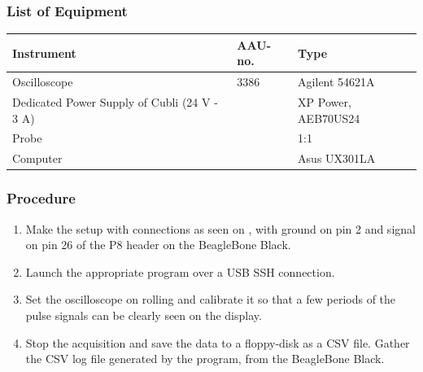 \subsubsection{List of Equipment}
\begin{table}[H]
  \begin{tabular}{|l|l|p{4.3cm}|}
    \hline%
    \textbf{Instrument}                                   &  \textbf{AAU-no.} &  \textbf{Type}            \\
    \hline%
    Oscilloscope                                          &  3386             &  Agilent 54621A           \\
    \hline%
    Dedicated Power Supply of Cubli \small{(24 V - 3 A)}  &                   &  XP Power, AEB70US24      \\
    \hline%
    Probe                                                 &                   &  1:1                      \\
    \hline%
      Computer                                            &                   &  Asus UX301LA  \\
    \hline%
  \end{tabular}
\end{table}

\subsubsection{Procedure}
\begin{enumerate}
  \item Make the setup with connections as seen on , with ground on pin 2 and signal on pin 26 of the P8 header on the BeagleBone Black.
  \item Launch the appropriate program over a USB SSH connection.
  \item Set the oscilloscope on rolling and calibrate it so that a few periods of the pulse signals can be clearly seen on the display.
  \item Stop the acquisition and save the data to a floppy-disk as a CSV file. Gather the CSV log file generated by the program, from the BeagleBone Black.
\end{enumerate}

